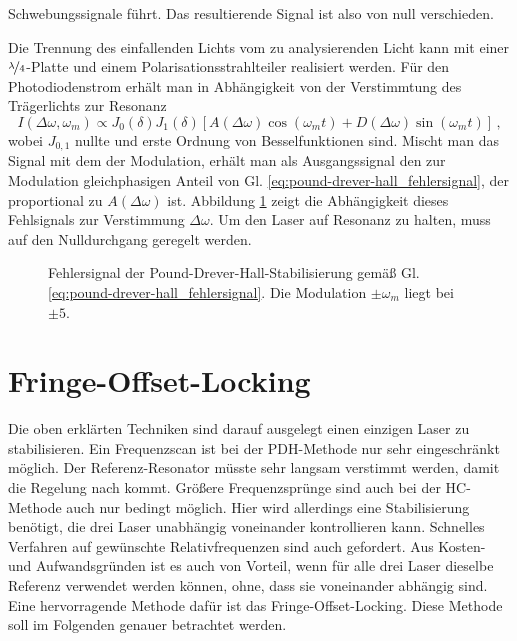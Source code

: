 Schwebungssignale führt. Das resultierende Signal ist also von null
verschieden.\par
Die Trennung des einfallenden Lichts vom zu analysierenden Licht kann mit einer
$\nicefrac{\lambda}{4}$-Platte und einem Polarisationsstrahlteiler realisiert
werden. Für den Photodiodenstrom erhält man in Abhängigkeit von der Verstimmtung
des Trägerlichts zur Resonanz
\begin{equation}\label{eq:pound-drever-hall_fehlersignal}
	I(\Delta\omega,\omega_m)\propto
	J_0(\delta)J_1(\delta)\left[A(\Delta\omega)\cos{(\omega_mt)}+D(\Delta\omega)\sin{(\omega_mt)}\right]\,,
\end{equation}
wobei $J_{0,1}$ nullte und erste Ordnung von Besselfunktionen sind. Mischt man
das Signal mit dem der Modulation, erhält man als Ausgangssignal den zur
Modulation gleichphasigen Anteil von
Gl. \eqref{eq:pound-drever-hall_fehlersignal}, der proportional zu
$A(\Delta\omega)$ ist.
Abbildung \ref{fig:pound-drever-hall_fehlersignal} zeigt die Abhängigkeit dieses
Fehlsignals zur Verstimmung $\Delta\omega$. Um den Laser auf Resonanz zu halten,
muss auf den Nulldurchgang geregelt werden.
\begin{figure}[h]
	\centering
	\footnotesize
	
	\caption[Hänsch-Couillaud - Fehlersignal]{Fehlersignal der
	Pound-Drever-Hall-Stabilisierung
	gemäß Gl.
	\eqref{eq:pound-drever-hall_fehlersignal}. Die Modulation 
	$\pm\omega_m$ liegt bei $\pm5$.}\label{fig:pound-drever-hall_fehlersignal}
\end{figure}

\section{Fringe-Offset-Locking}\label{sec:fringe-offset-locking}
Die oben erklärten Techniken sind darauf ausgelegt einen einzigen Laser zu
stabilisieren. Ein Frequenzscan ist bei der PDH-Methode nur sehr eingeschränkt
möglich. Der Referenz-Resonator müsste sehr langsam verstimmt werden, damit die
Regelung nach kommt. Größere Frequenzsprünge sind auch bei der HC-Methode auch
nur bedingt möglich. Hier wird allerdings eine Stabilisierung benötigt, die drei
Laser unabhängig voneinander kontrollieren kann. Schnelles Verfahren auf
gewünschte Relativfrequenzen sind auch gefordert. Aus Kosten- und
Aufwandsgründen ist es auch von Vorteil, wenn für alle drei Laser dieselbe
Referenz verwendet werden können, ohne, dass sie voneinander abhängig sind. Eine
hervorragende Methode dafür ist das Fringe-Offset-Locking. Diese Methode soll im
Folgenden genauer betrachtet werden.

